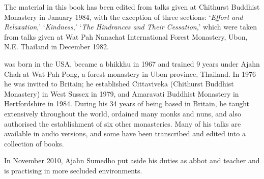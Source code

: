 
{\centering\par
\Large\scshape\chapTitleFont\thetitle
\par}
\vspace*{2\baselineskip}

{%
\setlength{\parskip}{1.5em}
\setlength{\parindent}{0pt}

The material in this book has been edited from talks given at Chithurst Buddhist Monastery in January 1984, with the exception of three sections: `\textit{Effort and Relaxation},' `\textit{Kindness},' `\textit{The Hindrances and Their Cessation},' which were taken from talks given at Wat Pah Nanachat International Forest Monastery, Ubon, N.E. Thailand in December 1982.
\bigskip

{\scshape \theauthor} was born in the USA, became a bhikkhu in 1967 and trained 9 years under Ajahn Chah at Wat Pah Pong, a forest monastery in Ubon province, Thailand.  In 1976 he was invited to Britain; he established Cittaviveka (Chithurst Buddhist Monastery) in West Sussex in 1979, and Amaravati Buddhist Monastery in Hertfordshire in 1984. During his 34 years of being based in Britain, he taught extensively throughout the world, ordained many monks and nuns, and also authorised the establishment of six other monasteries.  Many of his talks are available in audio versions, and some have been transcribed and edited into a collection of books.

In November 2010, Ajahn Sumedho put aside his duties as abbot and teacher and is practising in more secluded environments.

}


